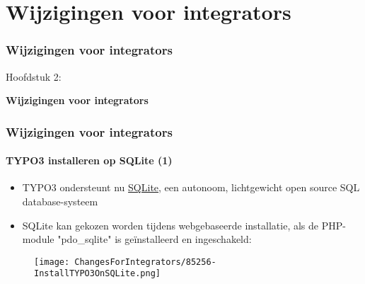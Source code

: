 %

\section{Wijzigingen voor integrators}
\begin{frame}[fragile]
	\frametitle{Wijzigingen voor integrators}

	\begin{center}\huge{Hoofdstuk 2:}\end{center}
	\begin{center}\huge{\color{typo3darkgrey}\textbf{Wijzigingen voor integrators}}\end{center}

\end{frame}


\begin{frame}[fragile]
	\frametitle{Wijzigingen voor integrators}
	\framesubtitle{TYPO3 installeren op SQLite (1)}

	\begin{itemize}
		\item TYPO3 ondersteunt nu \href{https://www.sqlite.org}{SQLite},
			een autonoom, lichtgewicht open source SQL database-systeem
		\item SQLite kan gekozen worden tijdens webgebaseerde installatie,
			als de PHP-module "pdo\_sqlite" is geïnstalleerd en ingeschakeld:
	\end{itemize}

	\begin{figure}
		\texttt{[image: ChangesForIntegrators/85256-InstallTYPO3OnSQLite.png]}
	\end{figure}

\end{frame}


